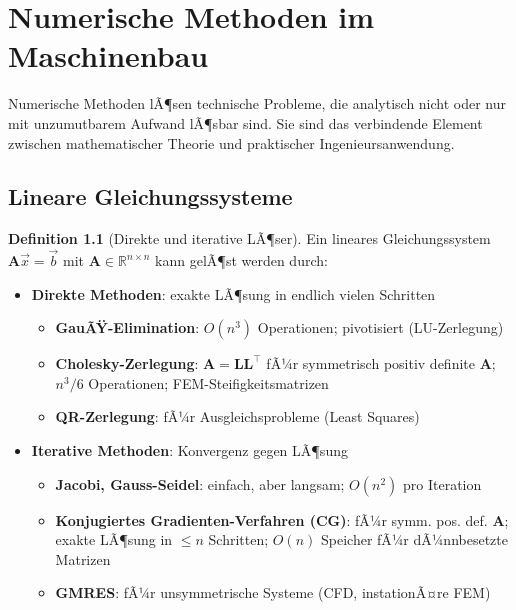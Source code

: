 ﻿\documentclass[a4paper,12pt]{report}
\theoremstyle{definition}
\newtheorem{definition}{Definition}
\begin{document}


\chapter{Numerische Methoden im Maschinenbau}

Numerische Methoden lÃ¶sen technische Probleme, die analytisch nicht
oder nur mit unzumutbarem Aufwand lÃ¶sbar sind. Sie sind das verbindende
Element zwischen mathematischer Theorie und praktischer Ingenieursanwendung.

\section{Lineare Gleichungssysteme}

\begin{definition}[Direkte und iterative LÃ¶ser]
Ein lineares Gleichungssystem $\mathbf{A}\vec{x} = \vec{b}$ mit
$\mathbf{A} \in \mathbb{R}^{n\times n}$ kann gelÃ¶st werden durch:
\begin{itemize}
    \item[-] \textbf{Direkte Methoden}: exakte LÃ¶sung in endlich vielen Schritten
          \begin{itemize}
              \item[-] \textbf{GauÃŸ-Elimination}: $O(n^3)$ Operationen; pivotisiert (LU-Zerlegung)
              \item[-] \textbf{Cholesky-Zerlegung}: $\mathbf{A} = \mathbf{L}\mathbf{L}^\top$
                    fÃ¼r symmetrisch positiv definite $\mathbf{A}$; $n^3/6$ Operationen;
                    FEM-Steifigkeitsmatrizen
              \item[-] \textbf{QR-Zerlegung}: fÃ¼r Ausgleichsprobleme (Least Squares)
          \end{itemize}
    \item[-] \textbf{Iterative Methoden}: Konvergenz gegen LÃ¶sung
          \begin{itemize}
              \item[-] \textbf{Jacobi, Gauss-Seidel}: einfach, aber langsam; $O(n^2)$ pro Iteration
              \item[-] \textbf{Konjugiertes Gradienten-Verfahren (CG)}: fÃ¼r symm. pos. def. $\mathbf{A}$;
                    exakte LÃ¶sung in $\le n$ Schritten; $O(n)$ Speicher fÃ¼r dÃ¼nnbesetzte Matrizen
              \item[-] \textbf{GMRES}: fÃ¼r unsymmetrische Systeme (CFD, instationÃ¤re FEM)
          \end{itemize}
\end{itemize}
\end{definition}
\end{document}
